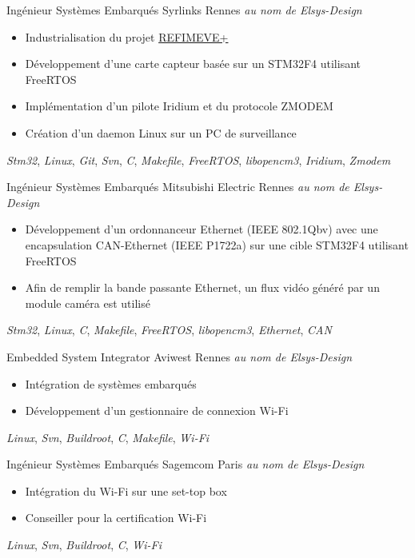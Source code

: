 \documentclass[11pt,a4paper,sans]{moderncv}
\begin{document}
	{Ingénieur Systèmes Embarqués}
	{Syrlinks}
	{Rennes}
	{\textit{au nom de Elsys-Design}}
	{
		\begin{itemize}
		\item Industrialisation du projet
			\href{http://www.refimeve.fr}{REFIMEVE+}
		\item Développement d'une carte capteur basée sur un STM32F4
			utilisant FreeRTOS
		\item Implémentation d'un pilote Iridium et du protocole ZMODEM
		\item Création d'un daemon Linux sur un PC de surveillance
		\end{itemize}
		\textit{Stm32},
		\textit{Linux},
		\textit{Git}, \textit{Svn},
		\textit{C}, \textit{Makefile},
		\textit{FreeRTOS}, \textit{libopencm3},
		\textit{Iridium}, \textit{Zmodem}
	}
	{Ingénieur Systèmes Embarqués}
	{Mitsubishi Electric}
	{Rennes}
	{\textit{au nom de Elsys-Design}}
	{
		\begin{itemize}
		\item Développement d'un ordonnanceur Ethernet (IEEE 802.1Qbv)
			avec une encapsulation CAN-Ethernet (IEEE P1722a)
				sur une cible STM32F4 utilisant FreeRTOS
		\item Afin de remplir la bande passante Ethernet, un flux vidéo
			généré par un module caméra est utilisé
		\end{itemize}
		\textit{Stm32},
		\textit{Linux},
		\textit{C}, \textit{Makefile},
		\textit{FreeRTOS}, \textit{libopencm3},
		\textit{Ethernet}, \textit{CAN}
	}
	{Embedded System Integrator}
	{Aviwest}
	{Rennes}
	{\textit{au nom de Elsys-Design}}
	{
		\begin{itemize}
		\item Intégration de systèmes embarqués
		\item Développement d'un gestionnaire de connexion Wi-Fi
		\end{itemize}
		\textit{Linux},
		\textit{Svn},
		\textit{Buildroot},
		\textit{C}, \textit{Makefile},
		\textit{Wi-Fi}
	}
	{Ingénieur Systèmes Embarqués}
	{Sagemcom}
	{Paris}
	{\textit{au nom de Elsys-Design}}
	{
		\begin{itemize}
		\item Intégration du Wi-Fi sur une set-top box
		\item Conseiller pour la certification Wi-Fi
		\end{itemize}
		\textit{Linux},
		\textit{Svn},
		\textit{Buildroot},
		\textit{C},
		\textit{Wi-Fi}
	}
\end{document}

